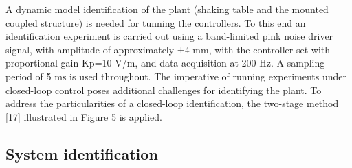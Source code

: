 \documentclass[conference]{IEEEtran}
\begin{document}
A dynamic model identification of the plant (shaking table and the mounted coupled structure) is needed for tunning the controllers. To this end an identification experiment is carried out using a band-limited pink noise driver signal, with amplitude of approximately ±4 mm, with the controller set with proportional gain Kp=10 V/m, and data acquisition at 200 Hz. A sampling period of 5 ms is used throughout. The imperative of running experiments under closed-loop control poses additional challenges for identifying the plant. To address the particularities of a closed-loop identification, the two-stage method [17] illustrated in Figure 5 is applied. 

\subsection{System identification}
\end{document}
